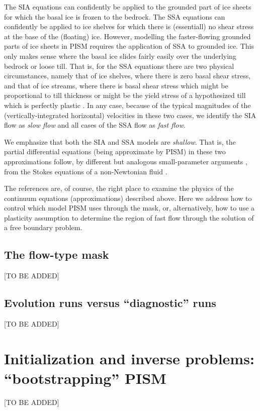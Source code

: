 \documentclass[11pt,final]{amsart}
\begin{document}
The SIA equations can confidently be applied to the grounded part of ice sheets for which the basal ice is frozen to the bedrock.  The SSA equations can confidently be applied to ice shelves for which there is (essentiall) no shear stress at the base of the (floating) ice.  However, modelling the faster-flowing grounded parts of ice sheets in PISM requires the application of SSA to grounded ice.  This only makes sense where the basal ice slides fairly easily over the underlying bedrock or loose till.  That is, for the SSA equations there are two physical circumstances, namely that of ice shelves, where there is zero basal shear stress, and that of ice streams, where there is basal shear stress which might be proportional to till thickness \cite{MacAyeal,HulbeMacAyeal} or might be the yield stress of a hypothesized till which is perfectly plastic \cite{SchoofStream}.  In any case, because of the typical magnitudes of the (vertically-integrated horizontal) velocities in these two cases, we identify the SIA flow as \emph{slow flow} and all cases of the SSA flow as \emph{fast flow}.

We emphasize that both the SIA and SSA models are \emph{shallow}.  That is, the partial differential equations (being approximate by PISM) in these two approximations follow, by different but analogous small-parameter arguments \cite[see the appendices]{SchoofStream}, from the Stokes equations of a non-Newtonian fluid \cite{Fowler}.

The references are, of course, the right place to examine the physics of the continuum equations (approximations) described above.  Here we address how to control which model PISM uses through the mask, or, alternatively, how to use a plasticity assumption to determine the region of fast flow through the solution of a free boundary problem.

\subsection{The flow-type mask} \label{subsect:mask}  [TO BE ADDED]

\subsection{Evolution runs versus ``diagnostic'' runs}  [TO BE ADDED]



\clearpage
\newpage
\section{Initialization and inverse problems: ``bootstrapping'' PISM}\label{sect:boot}  [TO BE ADDED]
\end{document}
